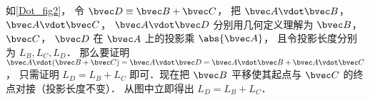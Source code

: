 如\autoref{Dot_fig2}， 令 $\bvec D \equiv \bvec B + \bvec C$， 把 $\bvec A \vdot \bvec B$，  $\bvec A \vdot \bvec C$，  $\bvec A \vdot \bvec D$ 分别用几何定义理解为 $\bvec B$，  $\bvec C$，  $\bvec D$ 在 $\bvec A$ 上的投影乘 $\abs{\bvec A}$， 且令投影长度分别为 $L_B, L_C, L_D$． 那么要证明 $\bvec A \vdot (\bvec B + \bvec C) = \bvec A \vdot \bvec D = \bvec A \vdot \bvec B + \bvec A \vdot \bvec C$， 只需证明 $L_D = L_B + L_C$ 即可．现在把 $\bvec B$ 平移使其起点与 $\bvec C$ 的终点对接（投影长度不变）． 从图中立即得出 $L_D = L_B + L_C$．  
